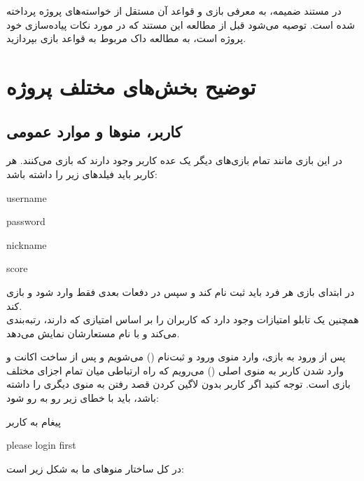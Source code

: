 \documentclass[]{article}
\begin{document}
در مستند ضمیمه، به معرفی بازی و قواعد آن مستقل از خواسته‌های پروژه پرداخته شده است. توصیه می‌شود قبل از مطالعه این مستند که در مورد نکات پیاده‌سازی خود پروژه است، به مطالعه داک مربوط به قواعد بازی بپردازید.





\section*{{\titr توضیح بخش‌های مختلف پروژه}}



\subsection*{{\titr کاربر، منوها و موارد عمومی}}

در این بازی مانند تمام بازی‌های دیگر یک عده کاربر وجود دارند که بازی می‌کنند. 
هر کاربر باید فیلد‌های زیر را داشته باشد:
\begin{itemize}[label=$\blacksquare$]
	\begin{latin}
		\item username
		\item password
		\item nickname
		\item score
	\end{latin}
\end{itemize}

در ابتدای بازی هر فرد باید ثبت نام کند و سپس در دفعات بعدی فقط وارد شود و 
بازی کند.
\\
همچنین یک تابلو امتیازات وجود دارد که کاربران را بر اساس امتیازی که دارند، 
رتبه‌بندی می‌کند و با نام مستعارشان نمایش می‌دهد.

پس از ورود به بازی، وارد منوی ورود و ثبت‌نام () می‌شویم و پس از 
ساخت اکانت و وارد شدن کاربر به منوی اصلی () می‌رویم که راه 
ارتباطی میان تمام اجزای مختلف بازی است. توجه کنید اگر کاربر بدون لاگین کردن قصد رفتن به منوی دیگری را داشته باشد، باید با خطای زیر رو به رو شود:
\begin{mybox}[colback=yellow]{پیغام به کاربر}
	\begin{latin}	
		please login first
	\end{latin}
\end{mybox}
\newpage
 در کل ساختار منوهای ما به شکل زیر است:
\end{document}
